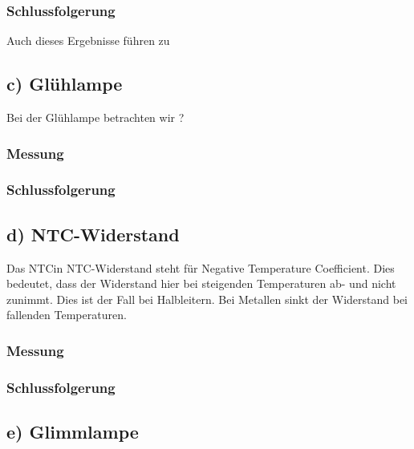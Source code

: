 \documentclass[11pt,a4paper,titlepage, ngerman]{article}
\begin{document}
			\subsubsection{Schlussfolgerung}
				
				Auch dieses Ergebnisse führen zu %
				
		\subsection{c) Glühlampe} 
			
			Bei der Glühlampe betrachten wir ?
			
			\subsubsection{Messung}
				
			
			\subsubsection{Schlussfolgerung}
			
				
		\subsection{d) NTC-Widerstand} %
			
			Das \glqq NTC\grqq in NTC-Widerstand steht für \glqq Negative Temperature Coefficient\grqq.
			Dies bedeutet, dass der Widerstand hier bei steigenden Temperaturen ab- und nicht zunimmt. Dies ist der Fall bei Halbleitern. Bei Metallen sinkt der Widerstand bei fallenden Temperaturen.
			
			\subsubsection{Messung}
			
				
			\subsubsection{Schlussfolgerung}
			
			
		\subsection{e) Glimmlampe} %
			
\end{document}
